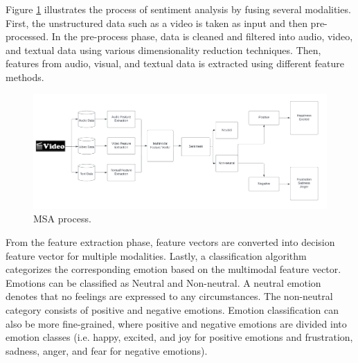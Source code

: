 Figure \ref{fig:msa_process} illustrates the process of sentiment analysis by fusing several modalities. First, the unstructured data such as a video is taken as input and then pre-processed. In the pre-process phase, data is cleaned and filtered into audio, video, and textual data using various dimensionality reduction techniques. Then, features from audio, visual, and textual data is extracted using different feature methods.  
%
\begin{figure}[h]
  \centering
  \includegraphics[width=\textwidth]{figures/msa_process_dpi.png}
  \caption{MSA process.}
  \label{fig:msa_process}
\end{figure}
%
From the feature extraction phase, feature vectors are converted into decision feature vector for multiple modalities. Lastly, a classification algorithm categorizes the corresponding emotion based on the multimodal feature vector. Emotions can be classified as Neutral and Non-neutral. A neutral emotion denotes that no feelings are expressed to any circumstances. The non-neutral category consists of positive and negative emotions. Emotion classification can also be more fine-grained, where positive and negative emotions are divided into emotion classes (i.e. happy, excited, and joy for positive emotions and frustration, sadness, anger, and fear for negative emotions).

